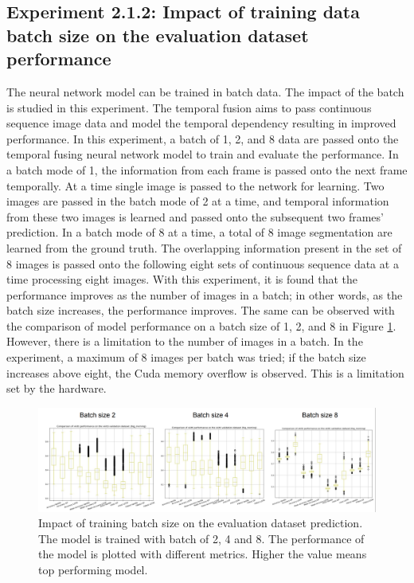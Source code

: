 	\subsection{Experiment 2.1.2: Impact of training data batch size on the evaluation dataset performance}
	
	The neural network model can be trained in batch data. The impact of the batch is studied in this experiment. The temporal fusion aims to pass continuous sequence image data and model the temporal dependency resulting in improved performance. In this experiment, a batch of 1, 2, and 8 data are passed onto the temporal fusing neural network model to train and evaluate the performance. In a batch mode of 1, the information from each frame is passed onto the next frame temporally. At a time single image is passed to the network for learning. Two images are passed in the batch mode of 2 at a time, and temporal information from these two images is learned and passed onto the subsequent two frames' prediction. In a batch mode of 8 at a time, a total of 8 image segmentation are learned from the ground truth. The overlapping information present in the set of 8 images is passed onto the following eight sets of continuous sequence data at a time processing eight images. With this experiment, it is found that the performance improves as the number of images in a batch; in other words, as the batch size increases, the performance improves. The same can be observed with the comparison of model performance on a batch size of 1, 2, and 8 in Figure \ref{fig:batch_wise_performance}. However, there is a limitation to the number of images in a batch. In the experiment, a maximum of 8 images per batch was tried; if the batch size increases above eight, the Cuda memory overflow is observed. This is a limitation set by the hardware. 

	\begin{figure}
		\centering
		\includegraphics[width=16cm]{images/batch_wise_performance_comparison.png}
		\caption{Impact of training batch size on the evaluation dataset prediction. The model is trained with batch of 2, 4 and 8. The performance of the model is plotted with different metrics. Higher the value means top performing model.}
		\label{fig:batch_wise_performance}
	\end{figure}		    
	
